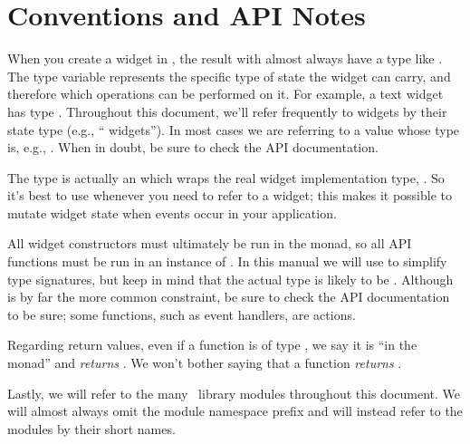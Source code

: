 \section{Conventions and API Notes}

When you create a widget in \vtyui, the result with almost always have
a type like .  The type variable  represents the
specific type of state the widget can carry, and therefore which
operations can be performed on it.  For example, a text widget has
type .  Throughout this document, we'll refer
frequently to widgets by their state type (e.g., ``
widgets''). In most cases we are referring to a value whose type is,
e.g., .  When in doubt, be sure to check the API
documentation.

The  type is actually an  which wraps the real
widget implementation type, .  So it's best to use
 whenever you need to refer to a widget; this makes it
possible to mutate widget state when events occur in your application.

All widget constructors must ultimately be run in the  monad,
so all API functions must be run in an instance of .  In
this manual we will use  to simplify type signatures, but keep
in mind that the actual type is likely to be .
Although  is by far the more common constraint, be sure to
check the API documentation to be sure; some functions, such as event
handlers, are  actions.

Regarding return values, even if a function is of type , we say it is ``in the  monad'' and \textit{returns}
.  We won't bother saying that a function \textit{returns }.

Lastly, we will refer to the many \vtyui\ library modules throughout
this document.  We will almost always omit the
 module namespace prefix and will instead
refer to the modules by their short names.
